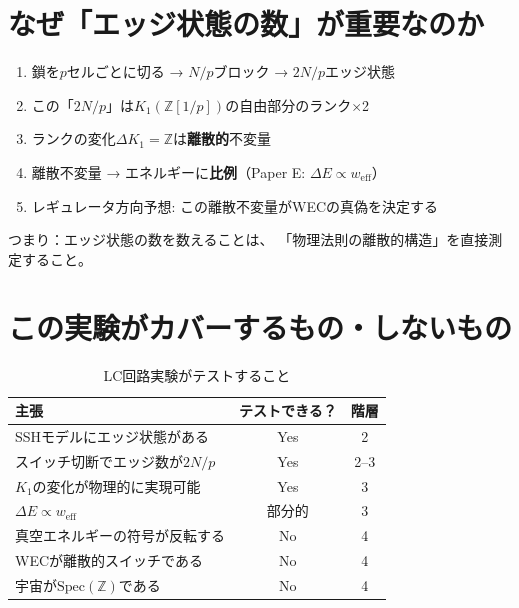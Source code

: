 \documentclass[12pt,a4paper]{article}
\newcommand{\Spec}{\mathrm{Spec}}
\begin{document}
\section{なぜ「エッジ状態の数」が重要なのか}

\begin{keybox}[核心的な論理]
\begin{enumerate}
\item 鎖を$p$セルごとに切る → $N/p$ブロック → $2N/p$エッジ状態
\item この「$2N/p$」は$K_1(\mathbb{Z}[1/p])$の自由部分のランク$\times$2
\item ランクの変化$\Delta K_1 = \mathbb{Z}$は\textbf{離散的}不変量
\item 離散不変量 → エネルギーに\textbf{比例}（Paper E: $\Delta E \propto w_{\mathrm{eff}}$）
\item レギュレータ方向予想: この離散不変量がWECの真偽を決定する
\end{enumerate}

つまり：エッジ状態の数を数えることは、
「物理法則の離散的構造」を直接測定すること。
\end{keybox}

\section{この実験がカバーするもの・しないもの}

\begin{table}[h]
\centering
\caption{LC回路実験がテストすること}
\begin{tabular}{@{}lcc@{}}
\toprule
主張 & テストできる？ & 階層 \\
\midrule
SSHモデルにエッジ状態がある & Yes & 2 \\
スイッチ切断でエッジ数が$2N/p$ & Yes & 2--3 \\
$K_1$の変化が物理的に実現可能 & Yes & 3 \\
$\Delta E \propto w_{\mathrm{eff}}$ & 部分的 & 3 \\
\midrule
真空エネルギーの符号が反転する & No & 4 \\
WECが離散的スイッチである & No & 4 \\
宇宙が$\Spec(\mathbb{Z})$である & No & 4 \\
\bottomrule
\end{tabular}
\end{table}
\end{document}
